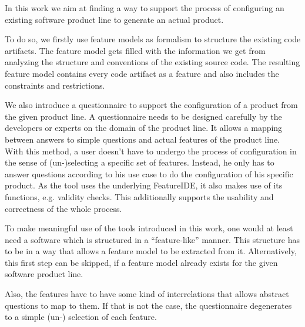 
In this work we aim at finding a way to support the process of configuring an existing software product line to generate an actual product. 

To do so, we firstly use feature models as formalism to structure the existing code artifacts. The feature model gets filled with the information we get from analyzing the structure and conventions of the existing source code. The resulting feature model contains every code artifact as a feature and also includes the constraints and restrictions.

We also introduce a questionnaire to support the configuration of a product from the given product line. A questionnaire needs to be designed carefully by the developers or experts on the domain of the product line. It allows a mapping between answers to simple questions and actual features of the product line. With this method, a user doesn't have to undergo the process of configuration in the sense of (un-)selecting a specific set of features. Instead, he only has to answer questions according to his use case to do the configuration of his specific product. As the tool uses the underlying FeatureIDE, it also makes use of its functions, e.g. validity checks. This additionally supports the usability and correctness of the whole process.


To make meaningful use of the tools introduced in this work, one would at least need a software which is structured in a ``feature-like'' manner. This structure has to be in a way that allows a feature model to be extracted from it. Alternatively, this first step can be skipped, if a feature model already exists for the given software product line.

Also, the features have to have some kind of interrelations that allows abstract questions to map to them. If that is not the case, the questionnaire degenerates to a simple (un-) selection of each feature.